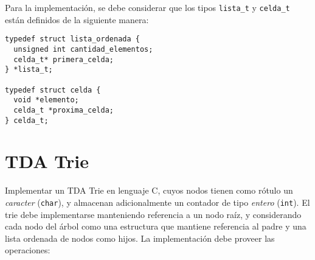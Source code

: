 \documentclass[12pt,a4paper]{article}
\begin{document}
Para la implementación, se debe considerar que los tipos \texttt{lista\_t} y \texttt{celda\_t} están definidos de la siguiente manera:

\begin{verbatim}
typedef struct lista_ordenada {
  unsigned int cantidad_elementos;
  celda_t* primera_celda;
} *lista_t;

typedef struct celda {
  void *elemento;
  celda_t *proxima_celda;
} celda_t;
\end{verbatim}

\section{TDA Trie}

Implementar un TDA Trie en lenguaje C, cuyos nodos tienen como rótulo un \emph{caracter} (\texttt{char}), y almacenan adicionalmente un contador de tipo \emph{entero} (\texttt{int}). El trie debe implementarse manteniendo referencia a un nodo raíz, y considerando cada nodo del árbol como una estructura que mantiene referencia al padre y una lista ordenada de nodos como hijos. La implementación debe proveer las operaciones:
\end{document}

